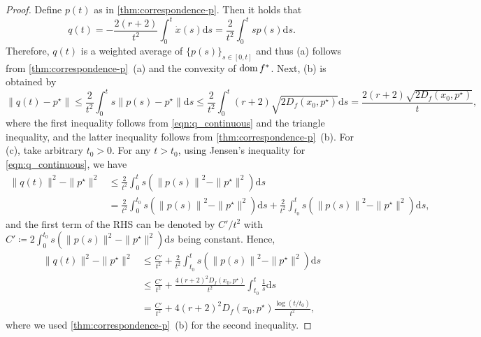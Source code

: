 \documentclass[11pt,a4paper]{article}
\theoremstyle{definition}
\theoremstyle{plain}
\newcommand{\rmd}{{\mathrm{d}}}
\newcommand{\dom}{\mathop{\rm dom}}
\begin{document}
\begin{proof}
    Define $p(t)$ as in \cref{thm:correspondence-p}.
    Then it holds that
    \begin{equation}\label{eqn:q_continuous}
        q(t) = -\frac{2(r + 2)}{t^2}\int_0^t\dot x(s)\rmd s = \frac2{t^2}\int_0^tsp(s)\rmd s.
    \end{equation}
    Therefore, $q(t)$ is a weighted average of $\{p(s)\}_{s \in [0, t]}$ and thus (a) follows from \cref{thm:correspondence-p}~(a) and the convexity of $\dom f^\ast$.
    Next, (b) is obtained by
    \[
        \left\|q(t) - p^\star\right\| \le \frac2{t^2}\int_0^ts\left\|p(s) - p^\star\right\|\rmd s \le \frac2{t^2}\int_0^t(r + 2)\sqrt{2D_f(x_0, p^\star)}\rmd s = \frac{2(r + 2)\sqrt{2D_f(x_0, p^\star)}}t,
    \]
    where the first inequality follows from \eqref{eqn:q_continuous} and the triangle inequality, and the latter inequality follows from \cref{thm:correspondence-p}~(b).
    For (c), take arbitrary $t_0 > 0$.
    For any $t > t_0$, using Jensen's inequality for \eqref{eqn:q_continuous}, we have
    \begin{align*}
        \|q(t)\|^2 - \|p^\star\|^2
        &\le \frac2{t^2}\int_0^ts\left(\left\|p(s)\right\|^2 - \|p^\star\|^2\right)\rmd s\\
        &= \frac2{t^2}\int_0^{t_0}s\left(\left\|p(s)\right\|^2 - \|p^\star\|^2\right)\rmd s + \frac2{t^2}\int_{t_0}^ts\left(\left\|p(s)\right\|^2 - \|p^\star\|^2\right)\rmd s,
    \end{align*}
    and the first term of the RHS can be denoted by $C'/t^2$ with $C' \coloneqq 2\int_0^{t_0}s(\|p(s)\|^2 - \|p^\star\|^2)\rmd s$ being constant.
    Hence,
    \begin{align*}
        \|q(t)\|^2 - \|p^\star\|^2
        &\le \frac{C'}{t^2} + \frac2{t^2}\int_{t_0}^ts\left(\left\|p(s)\right\|^2 - \|p^\star\|^2\right)\rmd s\\
        &\le \frac{C'}{t^2} + \frac{4(r + 2)^2D_f(x_0, p^\star)}{t^2}\int_{t_0}^t\frac1s\rmd s\\
        &= \frac{C'}{t^2} + 4(r + 2)^2D_f(x_0, p^\star)\frac{\log(t/t_0)}{t^2},
    \end{align*}
    where we used \cref{thm:correspondence-p}~(b) for the second inequality.
\end{proof}
\end{document}
